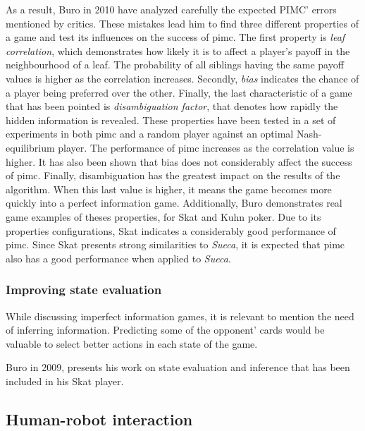 As a result, Buro in 2010 have analyzed carefully the expected PIMC' errors mentioned by critics. These mistakes lead him to find three different properties of a game and test its influences on the success of \gls{pimc}. The first property is \emph{leaf correlation}, which demonstrates how likely it is to affect a player's payoff in the neighbourhood of a leaf. The probability of all siblings having the same payoff values is higher as the correlation increases. Secondly, \emph{bias} indicates the chance of a player being preferred over the other. Finally, the last characteristic of a game that has been pointed is \emph{disambiguation factor}, that denotes how rapidly the hidden information is revealed. These properties have been tested in a set of experiments in both \gls{pimc} and a random player against an optimal Nash-equilibrium player. The performance of \gls{pimc} increases as the correlation value is higher. It has also been shown that bias does not considerably affect the success of \gls{pimc}. Finally, disambiguation has the greatest impact on the results of the algorithm. When this last value is higher, it means the game becomes more quickly into a perfect information game. Additionally, Buro demonstrates real game examples of theses properties, for Skat and Kuhn poker. Due to its properties configurations, Skat indicates a considerably good performance of \gls{pimc}. Since Skat presents strong similarities to \emph{Sueca}, it is expected that \gls{pimc} also has a good performance when applied to \emph{Sueca}.


\subsubsection{Improving state evaluation}

While discussing imperfect information games, it is relevant to mention the need of inferring information. Predicting some of the opponent' cards would be valuable to select better actions in each state of the game.

Buro in 2009, presents his work on state evaluation and inference that has been included in his Skat player. 


\subsection{Human-robot interaction}